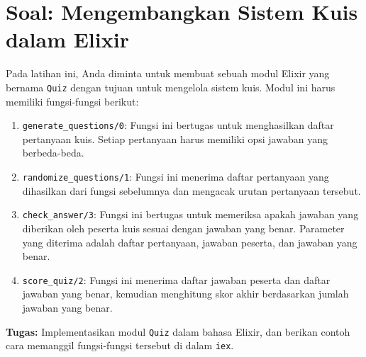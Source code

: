 \section{Soal: Mengembangkan Sistem Kuis dalam Elixir}

Pada latihan ini, Anda diminta untuk membuat sebuah modul Elixir yang bernama \texttt{Quiz} dengan tujuan untuk mengelola sistem kuis. Modul ini harus memiliki fungsi-fungsi berikut:

\begin{enumerate}
	\item \texttt{generate\_questions/0}: Fungsi ini bertugas untuk menghasilkan daftar pertanyaan kuis. Setiap pertanyaan harus memiliki opsi jawaban yang berbeda-beda.
	
	\item \texttt{randomize\_questions/1}: Fungsi ini menerima daftar pertanyaan yang dihasilkan dari fungsi sebelumnya dan mengacak urutan pertanyaan tersebut.
	
	\item \texttt{check\_answer/3}: Fungsi ini bertugas untuk memeriksa apakah jawaban yang diberikan oleh peserta kuis sesuai dengan jawaban yang benar. Parameter yang diterima adalah daftar pertanyaan, jawaban peserta, dan jawaban yang benar.
	
	\item \texttt{score\_quiz/2}: Fungsi ini menerima daftar jawaban peserta dan daftar jawaban yang benar, kemudian menghitung skor akhir berdasarkan jumlah jawaban yang benar.
\end{enumerate}

\textbf{Tugas:} Implementasikan modul \texttt{Quiz} dalam bahasa Elixir, dan berikan contoh cara memanggil fungsi-fungsi tersebut di dalam \texttt{iex}.



